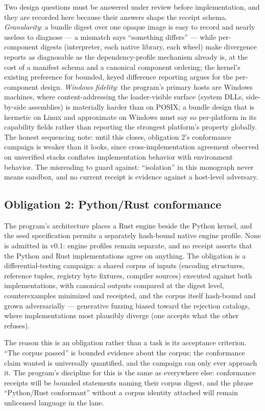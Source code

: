 Two design questions must be answered under review before implementation, and they are recorded here because their answers shape the receipt schema. \emph{Granularity}: a bundle digest over one opaque image is easy to record and nearly useless to diagnose --- a mismatch says ``something differs'' --- while per-component digests (interpreter, each native library, each wheel) make divergence reports as diagnosable as the dependency-profile mechanism already is, at the cost of a manifest schema and a canonical component ordering; the kernel's existing preference for bounded, keyed difference reporting argues for the per-component design. \emph{Windows fidelity}: the program's primary hosts are Windows machines, where content-addressing the loader-visible surface (system DLLs, side-by-side assemblies) is materially harder than on POSIX; a bundle design that is hermetic on Linux and approximate on Windows must say so per-platform in its capability fields rather than reporting the strongest platform's property globally. The honest sequencing note: until this closes, obligation 2's conformance campaign is weaker than it looks, since cross-implementation agreement observed on unverified stacks conflates implementation behavior with environment behavior. The misreading to guard against: ``isolation'' in this monograph never means sandbox, and no current receipt is evidence against a host-level adversary.

\subsection{Obligation 2: Python/Rust conformance}\label{evid:ob:conformance}

The program's architecture places a Rust engine beside the Python kernel, and the seed specification permits a separately hash-bound native engine profile. None is admitted in v0.1: engine profiles remain separate, and no receipt asserts that the Python and Rust implementations agree on anything. The obligation is a differential-testing campaign: a shared corpus of inputs (encoding structures, reference tuples, registry byte fixtures, compiler sources) executed against both implementations, with canonical outputs compared at the digest level, counterexamples minimized and receipted, and the corpus itself hash-bound and grown adversarially --- generative fuzzing biased toward the rejection catalogs, where implementations most plausibly diverge (one accepts what the other refuses).

The reason this is an obligation rather than a task is its acceptance criterion. ``The corpus passed'' is bounded evidence about the corpus; the conformance claim wanted is universally quantified, and the campaign can only ever approach it. The program's discipline for this is the same as everywhere else: conformance receipts will be bounded statements naming their corpus digest, and the phrase ``Python/Rust conformant'' without a corpus identity attached will remain unlicensed language in the lane.

